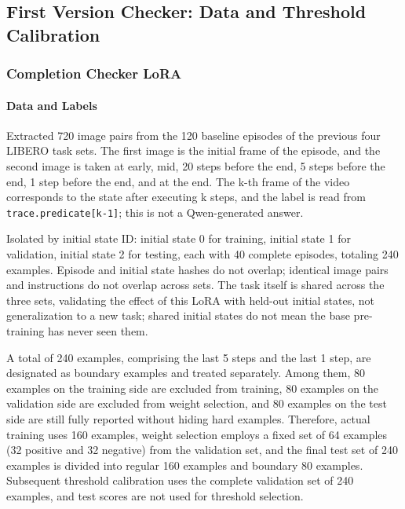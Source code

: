 \subsection{First Version Checker: Data and Threshold Calibration}\label{s11-detail-1}

\subsubsection{Completion Checker LoRA}\label{s11-detail-2}

\paragraph{Data and Labels}\label{s11-detail-3}

Extracted 720 image pairs from the 120 baseline episodes of the previous four LIBERO task sets. The first image is the initial frame of the episode, and the second image is taken at early, mid, 20 steps before the end, 5 steps before the end, 1 step before the end, and at the end. The k-th frame of the video corresponds to the state after executing k steps, and the label is read from \texttt{trace.predicate{[}k-1{]}}; this is not a Qwen-generated answer.

Isolated by initial state ID: initial state 0 for training, initial state 1 for validation, initial state 2 for testing, each with 40 complete episodes, totaling 240 examples. Episode and initial state hashes do not overlap; identical image pairs and instructions do not overlap across sets. The task itself is shared across the three sets, validating the effect of this LoRA with held-out initial states, not generalization to a new task; shared initial states do not mean the base pre-training has never seen them.

A total of 240 examples, comprising the last 5 steps and the last 1 step, are designated as boundary examples and treated separately. Among them, 80 examples on the training side are excluded from training, 80 examples on the validation side are excluded from weight selection, and 80 examples on the test side are still fully reported without hiding hard examples. Therefore, actual training uses 160 examples, weight selection employs a fixed set of 64 examples (32 positive and 32 negative) from the validation set, and the final test set of 240 examples is divided into regular 160 examples and boundary 80 examples. Subsequent threshold calibration uses the complete validation set of 240 examples, and test scores are not used for threshold selection.


